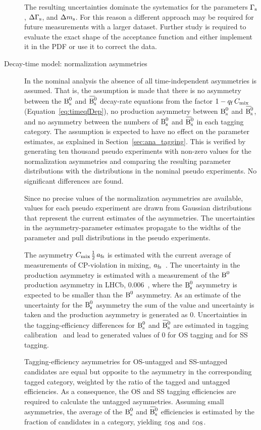 \begin{description}
The resulting uncertainties dominate the systematics for the parameters $\Gs$, $\DGs$, and $\Dms$. For this reason a different approach may
be required for future measurements with a larger dataset. Further study is required to evaluate the exact shape of the acceptance function
and either implement it in the PDF or use it to correct the data.

\item[Decay-time model: \BsBsbar{} normalization asymmetries]
In the nominal analysis the absence of all time-independent \BsBsbar{} asymmetries is assumed. That is, the assumption is made that there
is no asymmetry between the $\Bs$ and $\Bsbar$ decay-rate equations from the factor $1-\qf\,\Cm$ (Equation~\ref{eq:timeqfDep}), no
production asymmetry between $\Bs$ and $\Bsbar$, and no asymmetry between the numbers of $\Bs$ and $\Bsbar$ in each tagging category. The
assumption is expected to have no effect on the parameter estimates, as explained in Section~\ref{sec:ana_tagging}. This is verified by
generating ten thousand pseudo experiments with non-zero values for the normalization asymmetries and comparing the resulting parameter
distributions with the distributions in the nominal pseudo experiments. No significant differences are found.

Since no precise values of the normalization asymmetries are available, values for each pseudo experiment are drawn from Gaussian
distributions that represent the current estimates of the asymmetries. The uncertainties in the asymmetry-parameter estimates propagate to
the widths of the parameter and pull distributions in the pseudo experiments.

The asymmetry $\Cm$\textapprox$\tfrac{\text{1}}{\text{2}}\,\afs$ is estimated with the current average of measurements of CP-violation in
mixing, $\afs$\texteq{}~\cite{Amhis:2012bh}. The uncertainty in the production asymmetry is estimated with a
measurement of the $\Bd$ production asymmetry in LHCb, 0.006~\cite{LHCb-PAPER-2013-040}, where the $\Bs$ asymmetry is expected
to be smaller than the $\Bd$ asymmetry. As an estimate of the uncertainty for the $\Bs$ asymmetry the sum of the value and uncertainty is
taken and the production asymmetry is generated as 0. Uncertainties in the tagging-efficiency differences for $\Bs$ and $\Bsbar$
are estimated in tagging calibration~\cite{LHCb-ANA-2014-039} and lead to generated values of 0 for OS tagging and
 for SS tagging.

Tagging-efficiency asymmetries for OS-untagged and SS-untagged candidates are equal but opposite to the asymmetry in the corresponding
tagged category, weighted by the ratio of the tagged and untagged efficiencies. As a consequence, the OS and SS tagging efficiencies are
required to calculate the untagged asymmetries. Assuming small asymmetries, the average of the $\Bs$ and $\Bsbar$ efficiencies is estimated
by the fraction of candidates in a category, yielding $\tagCatCoef[\text{OS}]$ and
$\tagCatCoef[\text{OS}]$.


\end{description}
